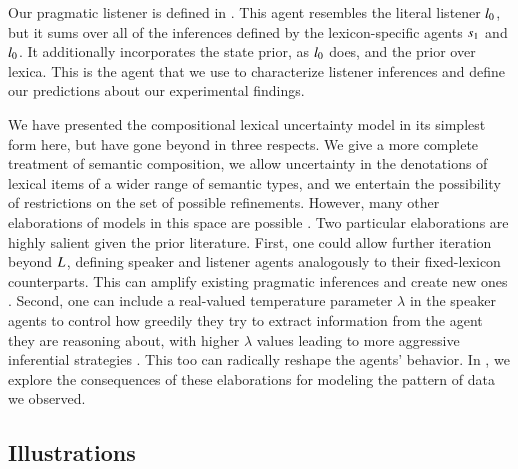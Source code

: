 \documentclass[leqno,12pt]{article}
\begin{document}
Our pragmatic listener is defined in . This agent
resembles the literal listener $l_{0}$, but it sums over all
of the inferences defined by the lexicon-specific agents $s_{1}$
and $l_{0}$. It additionally incorporates the state prior, as
$l_{0}$ does, and the prior over lexica.  This is the agent
that we use to characterize listener inferences and define our
predictions about our experimental findings.


We have presented the compositional lexical uncertainty model in its
simplest form here, but have gone beyond
\citeauthor{Bergen:Levy:Goodman:2014} in three respects. We give a
more complete treatment of semantic composition, we allow uncertainty
in the denotations of lexical items of a wider range of semantic
types, and we entertain the possibility of restrictions on the set of
possible refinements.  However, many other elaborations of models in
this space are possible \citep{Goodman:Lassiter:2013,
  Smith:Goodman:Frank:2013, Kao-etal:2014,Potts:Levy:2015}.  Two
particular elaborations are highly salient given the prior literature.
First, one could allow further iteration beyond
$L_{}$, defining speaker and listener agents
analogously to their fixed-lexicon counterparts. This can amplify
existing pragmatic inferences and create new ones
\citep{Bergen:Levy:Goodman:2014,Vogel-etal:2014,Potts:Levy:2015}.
Second, one can include a real-valued temperature parameter $\lambda$
in the speaker agents to control how greedily they try to extract
information from the agent they are reasoning about, with higher
$\lambda$ values leading to more aggressive inferential strategies
\citep{Sutton:Barto:1998}. This too can radically reshape the agents'
behavior. In , we explore the
consequences of these elaborations for modeling the pattern of data we
observed.


\subsection{Illustrations}\label{sec:illustrations}
\end{document}
